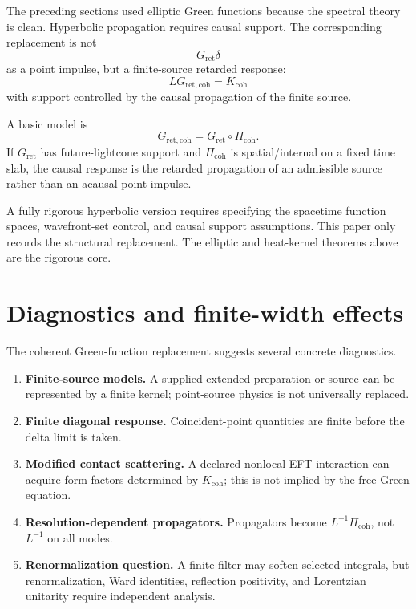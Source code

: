 \documentclass[11pt]{article}
\begin{document}
The preceding sections used elliptic Green functions because the spectral theory is clean. Hyperbolic propagation requires causal support. The corresponding replacement is not
\[
G_{\mathrm{ret}}\delta
\]
as a point impulse, but a finite-source retarded response:
\[
L G_{\mathrm{ret,coh}} = K_{\mathrm{coh}}
\]
with support controlled by the causal propagation of the finite source.

A basic model is
\[
G_{\mathrm{ret,coh}} = G_{\mathrm{ret}}\circ \Pi_{\mathrm{coh}}.
\]
If \(G_{\mathrm{ret}}\) has future-lightcone support and \(\Pi_{\mathrm{coh}}\) is spatial/internal on a fixed time slab, the causal response is the retarded propagation of an admissible source rather than an acausal point impulse.

\begin{remark}[Scope]
A fully rigorous hyperbolic version requires specifying the spacetime function spaces, wavefront-set control, and causal support assumptions. This paper only records the structural replacement. The elliptic and heat-kernel theorems above are the rigorous core.
\end{remark}

\section{Diagnostics and finite-width effects}

The coherent Green-function replacement suggests several concrete diagnostics.

\begin{enumerate}
\item \textbf{Finite-source models.} A supplied extended preparation or
source can be represented by a finite kernel; point-source physics is not
universally replaced.
\item \textbf{Finite diagonal response.} Coincident-point quantities are finite before the delta limit is taken.
\item \textbf{Modified contact scattering.} A declared nonlocal EFT
interaction can acquire form factors determined by \(K_{\mathrm{coh}}\);
this is not implied by the free Green equation.
\item \textbf{Resolution-dependent propagators.} Propagators become \(L^{-1}\Pi_{\mathrm{coh}}\), not \(L^{-1}\) on all modes.
\item \textbf{Renormalization question.} A finite filter may soften selected
integrals, but renormalization, Ward identities, reflection positivity, and
Lorentzian unitarity require independent analysis.
\end{enumerate}
\end{document}
